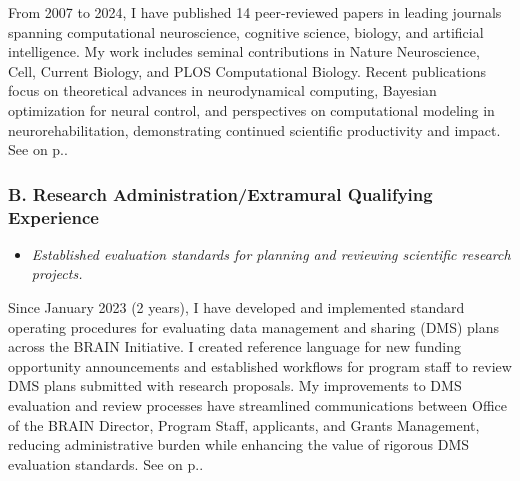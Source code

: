 \documentclass[10pt]{article}
\newcommand{\cf}[1]{\textcolor{hopkinsblue}{See \emph{\nameref{sec:#1}} on p.\pageref{sec:#1}}}
\begin{document}
From 2007 to 2024, I have published 14 peer-reviewed papers in leading
journals spanning computational neuroscience, cognitive science, biology, and
artificial intelligence. My work includes seminal contributions in Nature
Neuroscience, Cell, Current Biology, and PLOS Computational Biology. Recent
publications focus on theoretical advances in neurodynamical computing, Bayesian
optimization for neural control, and perspectives on computational modeling in
neurorehabilitation, demonstrating continued scientific productivity and impact.
\cf{journalpubs}.


\subsubsection*{B. Research Administration/Extramural Qualifying Experience}

\begin{itemize}
  \color{hopkinsblue}
  \item \emph{Established evaluation standards for planning and reviewing
scientific research projects.}
\end{itemize}

Since January 2023 (2 years), I have developed and implemented standard
operating procedures for evaluating data management and sharing (DMS) plans
across the BRAIN Initiative. I created reference language for new funding
opportunity announcements and established workflows for program staff to review
DMS plans submitted with research proposals. My improvements to DMS evaluation
and review processes have streamlined communications between Office of the
BRAIN Director, Program Staff, applicants, and Grants Management, reducing
administrative burden while enhancing the value of rigorous DMS evaluation
standards. \cf{jobobd}.
\end{document}
